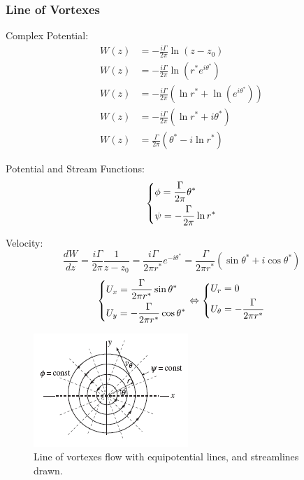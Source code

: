 \subsubsection{Line of Vortexes}
Complex Potential:
\begin{align}
    W(z) &= -\frac{i\Gamma}{2\pi}\ln(z-z_0) \\
    W(z) &= -\frac{i\Gamma}{2\pi}\ln(r^*e^{i\theta^*}) \\
    W(z) &= -\frac{i\Gamma}{2\pi}\left( \ln r^* + \ln(e^{i\theta^*}) \right) \\
    W(z) &= -\frac{i\Gamma}{2\pi}\left( \ln r^* + i\theta^* \right) \\
    W(z) &= \frac{\Gamma}{2\pi}\left( \theta^* - i\ln r^*\right)
\end{align}

Potential and Stream Functions:
\begin{equation}
    \begin{dcases}
        \phi = \frac{\Gamma}{2\pi} \theta^* \\
        \psi = - \frac{\Gamma}{2\pi} \ln r^*
    \end{dcases}
\end{equation}

Velocity:
\begin{equation}
    \frac{dW}{dz} =  \frac{i\Gamma}{2\pi} \frac{1}{z-z_0} = \frac{i\Gamma}{2\pi r^*} e^{-i\theta^*} = \frac{\Gamma}{2\pi r^*}\left(\sin\theta^* +i\cos\theta^* \right) 
\end{equation}
\begin{equation}
    \begin{dcases}
        U_x = \frac{\Gamma}{2\pi r^*}  \sin\theta^*\\
        U_y = -\frac{\Gamma}{2\pi r^*}  \cos\theta^*
    \end{dcases}
    \Leftrightarrow
    \begin{dcases}
        U_r = 0 \\
        U_{\theta} = -\frac{\Gamma}{2\pi r^*}
    \end{dcases}
\end{equation}

\begin{figure}[!h]
    \centering
    \includegraphics[scale=1.0]{./img/vortex_flow.png}
    \caption{Line of vortexes flow with equipotential lines, and streamlines drawn.}
    \label{joukowski_cylinder}
\end{figure}





